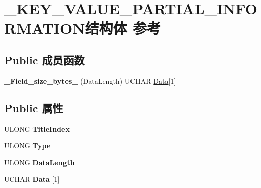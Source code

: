 \hypertarget{struct___k_e_y___v_a_l_u_e___p_a_r_t_i_a_l___i_n_f_o_r_m_a_t_i_o_n}{}\section{\+\_\+\+K\+E\+Y\+\_\+\+V\+A\+L\+U\+E\+\_\+\+P\+A\+R\+T\+I\+A\+L\+\_\+\+I\+N\+F\+O\+R\+M\+A\+T\+I\+O\+N结构体 参考}
\label{struct___k_e_y___v_a_l_u_e___p_a_r_t_i_a_l___i_n_f_o_r_m_a_t_i_o_n}
\subsection*{Public 成员函数}
\begin{DoxyCompactItemize}
\item 
\mbox{\label{struct___k_e_y___v_a_l_u_e___p_a_r_t_i_a_l___i_n_f_o_r_m_a_t_i_o_n_a2f793fed8382d867ecb1894f8c416d0a}} 
{\bfseries \+\_\+\+Field\+\_\+size\+\_\+bytes\+\_\+} (Data\+Length) U\+C\+H\+AR \hyperlink{struct_data}{Data}\mbox{[}1\mbox{]}
\end{DoxyCompactItemize}
\subsection*{Public 属性}
\begin{DoxyCompactItemize}
\item 
\mbox{\label{struct___k_e_y___v_a_l_u_e___p_a_r_t_i_a_l___i_n_f_o_r_m_a_t_i_o_n_a6c41bdad3f77e3edd1e523194d71033c}} 
U\+L\+O\+NG {\bfseries Title\+Index}
\item 
\mbox{\label{struct___k_e_y___v_a_l_u_e___p_a_r_t_i_a_l___i_n_f_o_r_m_a_t_i_o_n_adc962c994b129ee8eb74171d593679bc}} 
U\+L\+O\+NG {\bfseries Type}
\item 
\mbox{\label{struct___k_e_y___v_a_l_u_e___p_a_r_t_i_a_l___i_n_f_o_r_m_a_t_i_o_n_aa9e4845c7d08d0dc20c257df0d037891}} 
U\+L\+O\+NG {\bfseries Data\+Length}
\item 
\mbox{\label{struct___k_e_y___v_a_l_u_e___p_a_r_t_i_a_l___i_n_f_o_r_m_a_t_i_o_n_aa511760d2eccb18fa501dcd6b71fd31b}} 
U\+C\+H\+AR {\bfseries Data} \mbox{[}1\mbox{]}
\end{DoxyCompactItemize}


